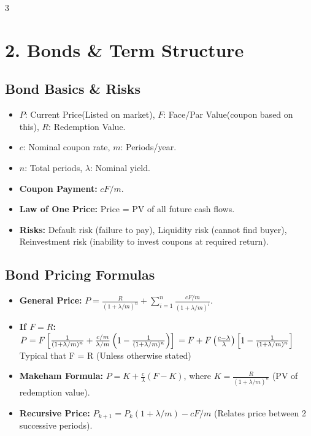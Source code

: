 \documentclass[8pt,a4paper,landscape]{extarticle}
\begin{document}
\begin{multicols*}{3}
    \section{2. Bonds \& Term Structure}

    \subsection{Bond Basics \& Risks}
    \begin{itemize}
        \item \textbf{$P$}: Current Price(Listed on market), \textbf{$F$}: Face/Par Value(coupon based on this), \textbf{$R$}: Redemption Value.
        \item \textbf{$c$}: Nominal coupon rate, \textbf{$m$}: Periods/year.
        \item \textbf{$n$}: Total periods, \textbf{$\lambda$}: Nominal yield.
        \item \textbf{Coupon Payment:} $cF/m$.
        \item \textbf{Law of One Price:} Price = PV of all future cash flows.
        \item \textbf{Risks:} Default risk (failure to pay), Liquidity risk (cannot find buyer), Reinvestment risk (inability to invest coupons at required return).
    \end{itemize}

    \subsection{Bond Pricing Formulas}
    \begin{itemize}
        \item \textbf{General Price:} $P = \frac{R}{(1+\lambda/m)^n} + \sum_{i=1}^n \frac{cF/m}{(1+\lambda/m)^i}$.
        \item \textbf{If $F = R$:} $P = F \left[ \frac{1}{(1 + \lambda / m)^n} + \frac{c/m}{\lambda / m} \left( 1 - \frac{1}{(1 + \lambda / m)^n} \right) \right] \\ = F + F\left(\frac{c-\lambda}{\lambda}\right)\left[1 - \frac{1}{(1+\lambda /m)^{n}}\right]$ \\ Typical that F = R (Unless otherwise stated)
        \item \textbf{Makeham Formula:} $P = K + \frac{c}{\lambda}(F-K)$, where $K = \frac{R}{(1+\lambda/m)^{n}}$ (PV of redemption value).
        \item \textbf{Recursive Price:} $P_{k+1} = P_k(1 + \lambda/m) - cF/m$ (Relates price between 2 successive periods).
    \end{itemize}


\end{multicols*}
\end{document}
